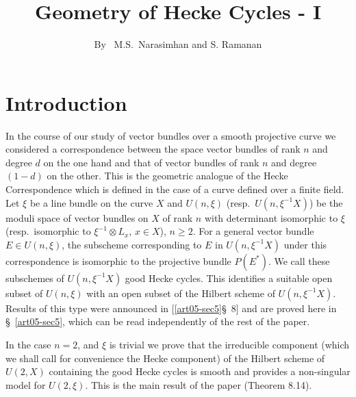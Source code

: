 \title{Geometry of Hecke Cycles - I}\label{art05}

\author{By~ M.S.~Narasimhan and S. Ramanan}

\date{}
\maketitle

\setcounter{page}{341}

\setcounter{pageoriginal}{290}
\section{Introduction}\label{art05-sec1}\pageoriginale

In the course of our study of vector bundles over a smooth projective
curve we considered \cite{art05-key5} a correspondence between the
space vector bundles of rank $n$ and degree $d$ on the one hand and
that of vector bundles of rank $n$ and degree $(1-d)$ on the
other. This is the geometric analogue of the Hecke Correspondence
which is defined in the case of a curve defined over a finite field. Let
$\xi$ be a line bundle on the curve $X$ and $U(n,\xi)$
(resp.~$U(n,\xi^{-1}X)$) be the moduli space of vector bundles on $X$
of rank $n$ with determinant isomorphic to $\xi$ (resp.~isomorphic to
$\xi^{-1}\otimes L_{x}$, $x\in X$), $n\geq 2$. For a general vector
bundle $E\in U(n,\xi)$, the subscheme corresponding to $E$ in
$U(n,\xi^{-1}X)$ under this correspondence is isomorphic to the
projective bundle $P(E^{*})$. We call these subschemes of
$U(n,\xi^{-1}X)$ good Hecke cycles. This identifies a suitable open
subset of $U(n,\xi)$ with an open subset of the Hilbert scheme of
$U(n,\xi^{-1}X)$. Results of this type were announced
in  [\ref{art05-sec5}\S~8] and are proved here in \S~\ref{art05-sec5},
which can be read independently of the rest of the paper.

In the case $n=2$, and $\xi$ is trivial we prove that the irreducible
component (which we shall call for convenience the Hecke component) of
the Hilbert scheme of $U(2,X)$ containing the good Hecke cycles is
smooth and provides a non-singular model for $U(2,\xi)$. This is the
main result of the paper (Theorem 8.14).

